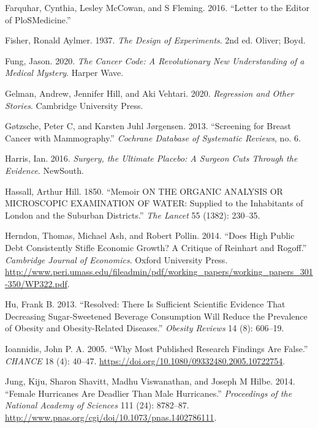 \documentclass[
  10ptls,
  b5paper]{book}
\newlength{\cslhangindent}
\newenvironment{CSLReferences}[2] %
 {\begin{list}{}{%
  \setlength{\itemindent}{0pt}
  \setlength{\leftmargin}{0pt}
  \setlength{\parsep}{0pt}
  \ifodd #1
   \setlength{\leftmargin}{\cslhangindent}
   \setlength{\itemindent}{-1\cslhangindent}
  \fi
  \setlength{\itemsep}{#2\baselineskip}}}
 {\end{list}}
\begin{document}
\begin{CSLReferences}{1}{0}
Farquhar, Cynthia, Lesley McCowan, and S Fleming. 2016. {``Letter to the Editor of PloSMedicine.''}

Fisher, Ronald Aylmer. 1937. \emph{The Design of Experiments}. 2nd ed. Oliver; Boyd.

Fung, Jason. 2020. \emph{The Cancer Code: A Revolutionary New Understanding of a Medical Mystery}. Harper Wave.

Gelman, Andrew, Jennifer Hill, and Aki Vehtari. 2020. \emph{Regression and Other Stories}. Cambridge University Press.

Gøtzsche, Peter C, and Karsten Juhl Jørgensen. 2013. {``Screening for Breast Cancer with Mammography.''} \emph{Cochrane Database of Systematic Reviews}, no. 6.

Harris, Ian. 2016. \emph{Surgery, the Ultimate Placebo: A Surgeon Cuts Through the Evidence}. NewSouth.

Hassall, Arthur Hill. 1850. {``Memoir ON THE ORGANIC ANALYSIS OR MICROSCOPIC EXAMINATION OF WATER: Supplied to the Inhabitants of London and the Suburban Districts.''} \emph{The Lancet} 55 (1382): 230--35.

Herndon, Thomas, Michael Ash, and Robert Pollin. 2014. {``Does High Public Debt Consistently Stifle Economic Growth? A Critique of Reinhart and Rogoff.''} \emph{Cambridge Journal of Economics}. Oxford University Press. \url{http://www.peri.umass.edu/fileadmin/pdf/working_papers/working_papers_301-350/WP322.pdf}.

Hu, Frank B. 2013. {``Resolved: There Is Sufficient Scientific Evidence That Decreasing Sugar-Sweetened Beverage Consumption Will Reduce the Prevalence of Obesity and Obesity-Related Diseases.''} \emph{Obesity Reviews} 14 (8): 606--19.

Ioannidis, John P. A. 2005. {``Why Most Published Research Findings Are False.''} \emph{CHANCE} 18 (4): 40--47. \url{https://doi.org/10.1080/09332480.2005.10722754}.

Jung, Kiju, Sharon Shavitt, Madhu Viswanathan, and Joseph M Hilbe. 2014. {``Female Hurricanes Are Deadlier Than Male Hurricanes.''} \emph{Proceedings of the National Academy of Sciences} 111 (24): 8782--87. \url{http://www.pnas.org/cgi/doi/10.1073/pnas.1402786111}.


\end{CSLReferences}
\end{document}
